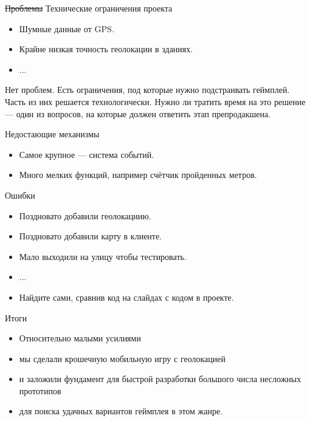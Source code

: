\documentclass[aspectratio=169,handout,bigger]{beamer}
\newcommand{\soutt}[1]{%
    \renewcommand{\ULthickness}{1pt}%
       \sout{#1}%
    \renewcommand{\ULthickness}{.4pt}%
}
\begin{document}

\begin{frame}{\soutt{Проблемы} Технические ограничения проекта}
  \begin{itemize}
    \item Шумные данные от GPS.
    \item Крайне низкая точность геолокации в зданиях.
    \item ...
  \end{itemize}

  Нет проблем. Есть ограничения, под которые нужно подстраивать геймплей.
  Часть из них решается технологически. Нужно ли тратить время на это решение
  --- один из вопросов, на которые должен ответить этап препродакшена.
\end{frame}


\begin{frame}{Недостающие механизмы}
  \begin{itemize}
    \item Самое крупное --- система событий.
    \item Много мелких функций, например счётчик пройденных метров.
  \end{itemize}
\end{frame}


\begin{frame}{Ошибки}
  \begin{itemize}
    \item Поздновато добавили геолокациию.
    \item Поздновато добавили карту в клиенте.
    \item Мало выходили на улицу чтобы тестировать.
    \item ...
    \item Найдите сами, сравнив код на слайдах с кодом в проекте.
  \end{itemize}
\end{frame}


\begin{frame}{Итоги}
  \begin{itemize}
    \item Относительно малыми усилиями
    \item мы сделали крошечную мобильную игру с геолокацией
    \item и заложили фундамент для быстрой разработки большого числа
          несложных прототипов
    \item для поиска удачных вариантов геймплея в этом жанре.
  \end{itemize}
\end{frame}
\end{document}
